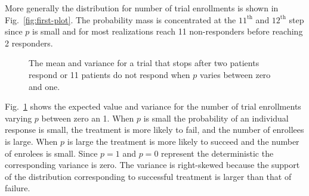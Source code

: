 \documentclass[review]{elsarticle}
\begin{document}
More generally the distribution for number of trial enrollments is shown in 
Fig.~\ref{fig:first-plot}. The probability mass is concentrated at the 
$11^{\text{th}}$ and $12^{\text{th}}$ step since $p$ 
is small and for most realizations reach 11 
non-responders before reaching 2 responders.

\begin{figure}[bp!]
\centering
{}
\hfill
{}
\caption{
The mean and variance for a trial that stops after two patients respond
or 11 patients do not respond when $p$ varies between zero and one.
}
\label{fig:exp-and-var}
\end{figure}

Fig.~\ref{fig:exp-and-var} shows the expected value and variance for the
number of trial enrollments varying $p$ between zero an 1. When $p$ is
small the probability of an individual response is small, the treatment
is more likely to fail, and the number of enrollees is large. When $p$
is large the treatment is more likely to succeed and the number of 
enrolees is small. Since $p=1$ and $p=0$ represent the deterministic
the corresponding variance is zero. The variance is right-skewed because
the support of the distribution corresponding to successful treatment
is larger than that of failure.
\end{document}
